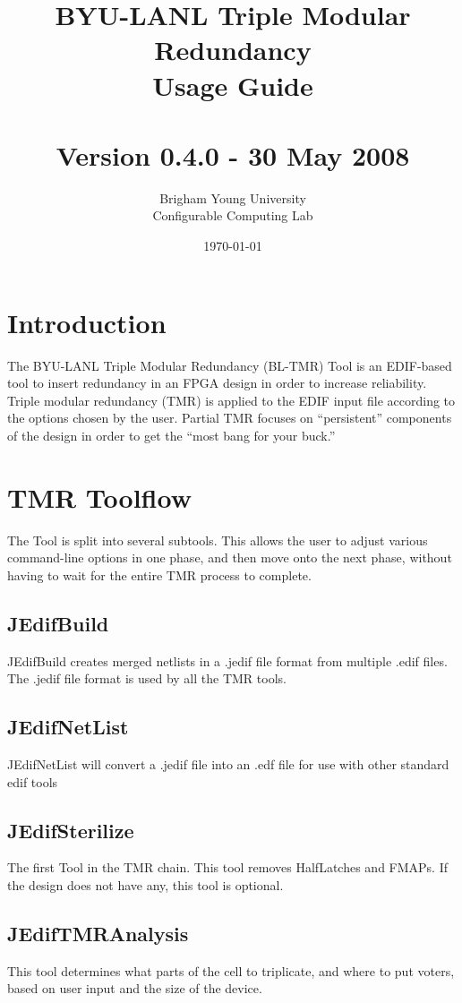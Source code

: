 \documentclass[english]{article}
\title{BYU-LANL Triple Modular Redundancy \\ Usage Guide \\ ~ \\
  Version 0.4.0 - 30 May 2008 \\  }
\author{Brigham Young University \\ Configurable Computing Lab}
\date{\today}
\begin{document}
\maketitle

\newpage
\tableofcontents
\newpage

\section{Introduction}
The BYU-LANL Triple Modular Redundancy (BL-TMR) Tool is an EDIF-based tool to 
insert redundancy in an FPGA design in order to increase reliability. Triple 
modular redundancy (TMR) is applied to the EDIF input file according to the 
options chosen by the user. Partial TMR focuses on ``persistent'' components of 
the design in order to get the ``most bang for your buck.''

\section{TMR Toolflow}
The Tool is split into several subtools. This allows the user to adjust various 
command-line options in one phase, and then move onto the next phase, without
having to wait for the entire TMR process to complete.

\subsection{JEdifBuild}
JEdifBuild creates merged netlists in a .jedif file format from 
multiple .edif files. The .jedif file format is used by all the TMR tools.

\subsection{JEdifNetList}
JEdifNetList will convert a .jedif file into an .edf file for use with other
standard edif tools 

\subsection{JEdifSterilize}
The first Tool in the TMR chain. This tool removes HalfLatches and FMAPs. If the 
design does not have any, this tool is optional.

\subsection{JEdifTMRAnalysis}
This tool determines what parts of the cell to triplicate, and where to put voters,
based on user input and the size of the device.
\end{document}
